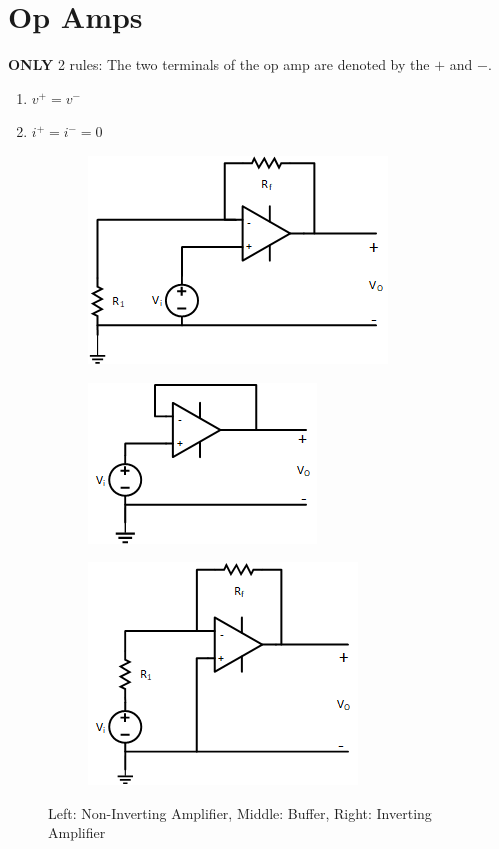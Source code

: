 \documentclass[10pt,letterpaper,twoside,notitlepage]{article}
\begin{document}
\section*{Op Amps}
	\textbf{ONLY} 2 rules: \newline
	The two terminals of the op amp are denoted by the $+$ and $-$.
	\begin{enumerate}
		\item $v^{+}=v^{-}$
		\item $i^{+}=i^{-}=0$
	\end{enumerate}
	\vspace{3mm} %
	
	\begin{figure}[ht]
		\begin{subfigure}
			\centering
			\includegraphics[scale=.7]{NonInvertingAmp.png}
			\label{fig:Non-Inverting Amplifier}
		\end{subfigure}
		\begin{subfigure}
			\centering
			\includegraphics[scale=.7]{Buffer.png}
			\label{fig:Buffer}
		\end{subfigure}
		\hspace{5mm}
		\begin{subfigure}
			\centering
			\includegraphics[scale=.7]{InvertingAmp.png}
			\label{fig:Inverting Amplifier}
		\end{subfigure}
		\caption{Left: Non-Inverting Amplifier, Middle: Buffer, Right: Inverting Amplifier}
	\end{figure}
\end{document}
